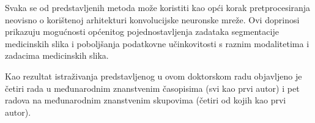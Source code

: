 Svaka se od predstavljenih metoda može koristiti kao opći korak pretprocesiranja neovisno o korištenoj arhitekturi konvolucijske neuronske mreže. Ovi doprinosi prikazuju mogućnosti općenitog pojednostavljenja zadataka segmentacije medicinskih slika i poboljšanja podatkovne učinkovitosti s raznim modalitetima i zadacima medicinskih slika.

Kao rezultat istraživanja predstavljenog u ovom doktorskom radu objavljeno je četiri rada u međunarodnim znanstvenim časopisima (svi kao prvi autor) i pet radova na međunarodnim znanstvenim skupovima (četiri od kojih kao prvi autor).